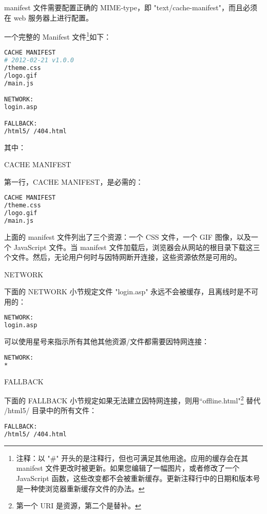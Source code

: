 manifest 文件需要配置正确的 MIME-type，即 "text/cache-manifest"，而且必须在 web 服务器上进行配置。


一个完整的 Manifest 文件\footnote{注释：以 "\#" 开头的是注释行，但也可满足其他用途。应用的缓存会在其 manifest 文件更改时被更新。如果您编辑了一幅图片，或者修改了一个 JavaScript 函数，这些改变都不会被重新缓存。更新注释行中的日期和版本号是一种使浏览器重新缓存文件的办法。}如下：

\begin{lstlisting}[language=bash]
CACHE MANIFEST
# 2012-02-21 v1.0.0
/theme.css
/logo.gif
/main.js

NETWORK:
login.asp

FALLBACK:
/html5/ /404.html
\end{lstlisting}

其中：



\begin{compactenum}
\item CACHE MANIFEST

第一行，CACHE MANIFEST，是必需的：

\begin{lstlisting}[language=bash]
CACHE MANIFEST
/theme.css
/logo.gif
/main.js
\end{lstlisting}

上面的 manifest 文件列出了三个资源：一个 CSS 文件，一个 GIF 图像，以及一个 JavaScript 文件。当 manifest 文件加载后，浏览器会从网站的根目录下载这三个文件。然后，无论用户何时与因特网断开连接，这些资源依然是可用的。



\item NETWORK

下面的 NETWORK 小节规定文件 "login.asp" 永远不会被缓存，且离线时是不可用的：

\begin{lstlisting}[language=bash]
NETWORK:
login.asp
\end{lstlisting}

可以使用星号来指示所有其他其他资源/文件都需要因特网连接：

\begin{lstlisting}[language=bash]
NETWORK:
*
\end{lstlisting}



\item FALLBACK

下面的 FALLBACK 小节规定如果无法建立因特网连接，则用``offline.html"\footnote{第一个 URI 是资源，第二个是替补。} 替代 /html5/ 目录中的所有文件：

\begin{lstlisting}[language=bash]
FALLBACK:
/html5/ /404.html
\end{lstlisting}



\end{compactenum}




